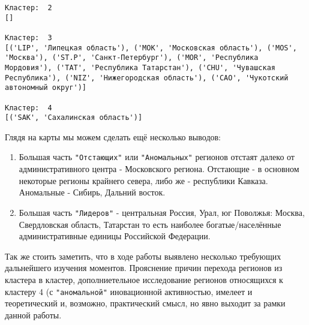 \documentclass[11pt]{article}
\begin{document}
\begin{Verbatim}[commandchars=\\\{\}]
Кластер:  2
[]

Кластер:  3
[('LIP', 'Липецкая область'), ('MOK', 'Московская область'), ('MOS', 'Москва'), ('ST.P', 'Санкт-Петербург'), ('MOR', 'Республика Мордовия'), ('TAT', 'Республика Татарстан'), ('CHU', 'Чувашская Республика'), ('NIZ', 'Нижегородская область'), ('CAO', 'Чукотский автономный округ')]

Кластер:  4
[('SAK', 'Сахалинская область')]

    \end{Verbatim}

    Глядя на карты мы можем сделать ещё несколько выводов:

\begin{enumerate}
\item Большая часть \verb'"Отстающих"' или \verb'"Аномальных"' регионов отстаят далеко от административного центра - Московского региона. Отстающие - в основном некоторые регионы крайнего севера, либо же - республики Кавказа. Аномальные - Сибирь, Дальний восток.
\item Большая часть \verb'"Лидеров"' - центральная Россия, Урал, юг Поволжья: Москва, Свердловская область, Татарстан то есть наиболее богатые/населённые  административные единицы Российской Федерации.
\end{enumerate}

Так же стоить заметить, что в ходе работы выявлено несколько требующих
дальнейшего изучения моментов. Прояснение причин перехода регионов из
кластера в кластер, дополниетельное исследование регионов относящихся к
кластеру 4 (с \verb'"аномальной"' иновационной активностью, имелеет и
теоретический и, возможно, практический смысл, но явно выходит за рамки
данной работы.

\end{document}
